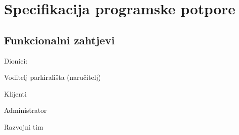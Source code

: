 
\chapter{Specifikacija programske potpore}


\section{Funkcionalni zahtjevi}


{Dionici: \begin{packed_enum}
		\item {Voditelj parkirališta (naručitelj)}
		\item {Klijenti}
		\item {Administrator}
		\item {Razvojni tim}
	\end{packed_enum}       
	
}
